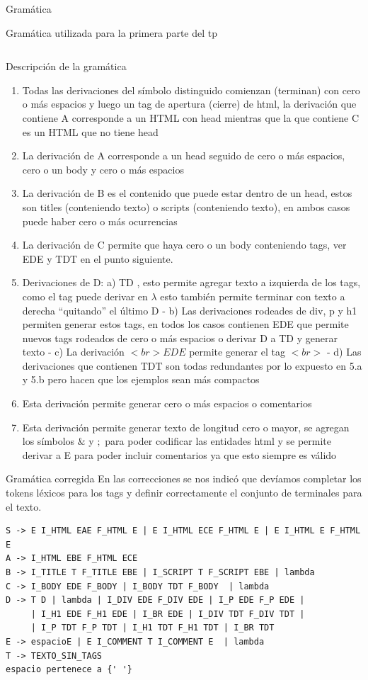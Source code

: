 \documentclass[a4paper,8pt]{article}
\begin{document}
\begin{section}{Gramática}
\begin{subsection}{Gramática utilizada para la primera parte del tp}
\begin{verbatim}
\end{verbatim}
\bigskip

Descripción de la gramática
\begin{enumerate}
 \item Todas las derivaciones del símbolo distinguido comienzan (terminan) con cero o más espacios y luego un tag de apertura (cierre) de html, la derivación que contiene A corresponde a un HTML con head mientras que la que contiene C es un HTML que no tiene head
 \item La derivación de A corresponde a un head seguido de cero o más espacios, cero o un body y cero o más espacios
\item La derivación de B es el contenido que puede estar dentro de un head, estos son titles (conteniendo texto) o scripts (conteniendo texto), en ambos casos puede haber cero o más ocurrencias
\item La derivación de C permite que haya cero o un body conteniendo tags, ver EDE y TDT en el punto siguiente.
\item Derivaciones de D: a) TD  , esto permite agregar texto a izquierda de los tags, como el tag puede derivar en $\lambda$ esto también permite terminar con texto a derecha “quitando” el último D - b) Las derivaciones rodeades de div, p y h1 permiten generar estos tags, en todos los casos contienen EDE que permite nuevos tags rodeados de cero o más espacios o derivar D a TD y generar texto - c) La derivación $<br>EDE$ permite generar el tag $<br>$ - d) Las derivaciones que contienen TDT son todas redundantes por lo expuesto en 5.a y 5.b pero hacen que los ejemplos sean más compactos
\item Esta derivación permite generar cero o más espacios o comentarios
\item Esta derivación permite generar texto de longitud cero o mayor, se agregan los símbolos $\&$ y $;$ para poder codificar las entidades html y se permite derivar a E para poder incluir comentarios ya que esto siempre es válido
\end{enumerate}

\end{subsection}

\begin{subsection}{Gramática corregida}
En las correcciones se nos indicó que devíamos completar los tokens léxicos para los tags y definir correctamente el conjunto de terminales para el texto.
\bigskip

\begin{verbatim}
S -> E I_HTML EAE F_HTML E | E I_HTML ECE F_HTML E | E I_HTML E F_HTML E
A -> I_HTML EBE F_HTML ECE
B -> I_TITLE T F_TITLE EBE | I_SCRIPT T F_SCRIPT EBE | lambda
C -> I_BODY EDE F_BODY | I_BODY TDT F_BODY  | lambda
D -> T D | lambda | I_DIV EDE F_DIV EDE | I_P EDE F_P EDE | 
     | I_H1 EDE F_H1 EDE | I_BR EDE | I_DIV TDT F_DIV TDT | 
     | I_P TDT F_P TDT | I_H1 TDT F_H1 TDT | I_BR TDT
E -> espacioE | E I_COMMENT T I_COMMENT E  | lambda 
T -> TEXTO_SIN_TAGS 
espacio pertenece a {' '}


\end{verbatim}
\end{subsection}
\end{section}
\end{document}
